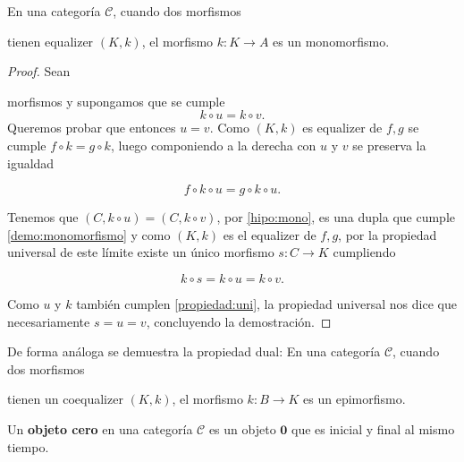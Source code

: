 \begin{proposicion}
    En una categoría $\mathscr{C}$, cuando dos morfismos  tienen equalizer $(K,k)$, el morfismo $k: K \longrightarrow A$ es un monomorfismo.
\end{proposicion}
\begin{proof}
    Sean  morfismos y supongamos que se cumple 
    \begin{equation} \label{hipo:mono}
        k \circ u = k \circ v\text{.}
    \end{equation}
    Queremos probar que entonces $u = v$. Como $(K,k)$ es equalizer de $f,g$ se cumple $f \circ k = g \circ k$, luego componiendo a la derecha con $u$ y $v$ se preserva la igualdad

    \begin{equation} \label{demo:monomorfismo}
        f \circ k \circ u = g \circ k \circ u \text{.}
    \end{equation}

    Tenemos que $(C, k \circ u) = (C, k \circ v)$, por \eqref{hipo:mono}, es una dupla que cumple \eqref{demo:monomorfismo} y como $(K,k)$ es el equalizer de $f,g$, por la propiedad universal de este límite existe un único morfismo $s: C \longrightarrow K$ cumpliendo

    \begin{equation} \label{propiedad:uni}
        k \circ s = k \circ u = k \circ v \text{.}
    \end{equation}

    Como $u$ y $k$ también cumplen \eqref{propiedad:uni}, la propiedad universal nos dice que necesariamente $s = u = v$, concluyendo la demostración.
\end{proof}

De forma análoga se demuestra la propiedad dual: En una categoría $\mathscr{C}$, cuando dos morfismos  tienen un coequalizer $(K,k)$, el morfismo $k: B \longrightarrow K$ es un epimorfismo.

\begin{definicion}
    Un \textbf{objeto cero} en una categoría $\mathscr{C}$ es un objeto $\boldsymbol{0}$ que es inicial y final al mismo tiempo. 
\end{definicion}

